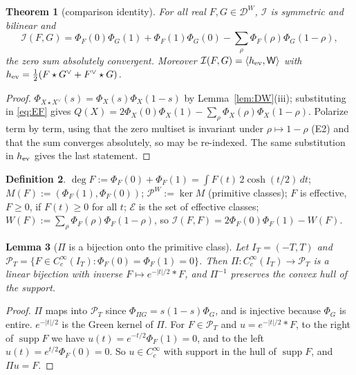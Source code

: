 \documentclass[11pt]{amsart}
\newtheorem{theorem}{Theorem}[section]
\newtheorem{lemma}[theorem]{Lemma}
\theoremstyle{definition}
\newtheorem{definition}[theorem]{Definition}
\theoremstyle{remark}
\newcommand{\supp}{\operatorname{supp}}
\newcommand{\DW}{\mathcal D^{W}}
\newcommand{\PW}{\mathcal P^{W}}
\newcommand{\Ef}{\mathcal E}
\newcommand{\I}{\mathcal I}
\newcommand{\dg}{\deg}
\begin{document}
\begin{theorem}[comparison identity]\label{thm:comparison}
For all real $F,G\in\DW$, $\I$ is symmetric and bilinear and
\begin{equation}\label{eq:comparison}
\I(F,G)=\Phi_F(0)\Phi_G(1)+\Phi_F(1)\Phi_G(0)-\sum_\rho\Phi_F(\rho)\Phi_G(1-\rho),
\end{equation}
the zero sum absolutely convergent. Moreover $\I(F,G)=\langle h_{\rm ev},\mathsf W\rangle$ with
$h_{\rm ev}=\frac12(F\star G^\vee+F^\vee\star G)$.
\end{theorem}
\begin{proof}
$\Phi_{X\star X^\vee}(s)=\Phi_X(s)\Phi_X(1-s)$ by Lemma~\ref{lem:DW}(iii); substituting in \eqref{eq:EF}
gives $Q(X)=2\Phi_X(0)\Phi_X(1)-\sum_\rho\Phi_X(\rho)\Phi_X(1-\rho)$. Polarize term by term, using that the
zero multiset is invariant under $\rho\mapsto1-\rho$ (E2) and that the sum converges absolutely, so may
be re-indexed. The same substitution in $h_{\rm ev}$ gives the last statement.
\end{proof}

\begin{definition}\label{def:deg}
$\dg F:=\Phi_F(0)+\Phi_F(1)=\int F(t)\,2\cosh(t/2)\,dt$; $M(F):=(\Phi_F(1),\Phi_F(0))$;
$\PW:=\ker M$ (primitive classes); $F$ is effective, $F\ge0$, if $F(t)\ge0$ for all $t$; $\Ef$ is the
set of effective classes; $W(F):=\sum_\rho\Phi_F(\rho)\Phi_F(1-\rho)$, so $\I(F,F)=2\Phi_F(0)\Phi_F(1)-W(F)$.
\end{definition}

\begin{lemma}[$\Pi$ is a bijection onto the primitive class]\label{lem:Pi}
Let $I_T=(-T,T)$ and $\mathcal P_T=\{F\in C_c^\infty(I_T):\Phi_F(0)=\Phi_F(1)=0\}$. Then
$\Pi:C_c^\infty(I_T)\to\mathcal P_T$ is a linear bijection with inverse $F\mapsto e^{-|t|/2}\ast F$, and
$\Pi^{-1}$ preserves the convex hull of the support.
\end{lemma}
\begin{proof}
$\Pi$ maps into $\mathcal P_T$ since $\Phi_{\Pi G}=s(1-s)\Phi_G$, and is injective because $\Phi_G$ is entire.
$e^{-|t|/2}$ is the Green kernel of $\Pi$. For $F\in\mathcal P_T$ and $u=e^{-|t|/2}\ast F$, to the right of
$\supp F$ we have $u(t)=e^{-t/2}\Phi_F(1)=0$, and to the left $u(t)=e^{t/2}\Phi_F(0)=0$. So $u\in C_c^\infty$
with support in the hull of $\supp F$, and $\Pi u=F$.
\end{proof}

\end{document}
